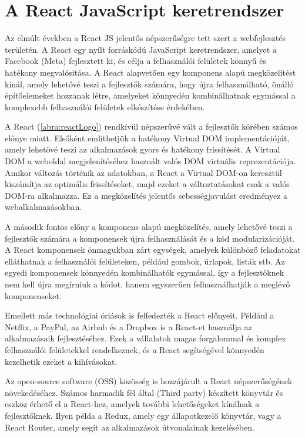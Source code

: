\section {A React JavaScript keretrendszer}

Az elmúlt években a React JS jelentős népszerűségre tett szert a webfejlesztés területén. A React egy nyílt forráskódú JavaScript keretrendszer, amelyet a Facebook (Meta) fejlesztett ki, és célja a felhasználói felületek könnyű és hatékony megvalósítása. A React alapvetően egy komponens alapú megközelítést kínál, amely lehetővé teszi a fejlesztők számára, hogy újra felhasználható, önálló építőelemeket hozzanak létre, amelyeket könnyedén kombinálhatnak egymással a komplexebb felhasználói felületek elkészítése érdekében.

A React (\ref{abra:reactLogo}) rendkívül népszerűvé vált a fejlesztők körében számos előnye miatt. Elsőként említhetjük a hatékony Virtual DOM implementációját, amely lehetővé teszi az alkalmazások gyors és hatékony frissítését. A Virtual DOM a weboldal megjelenítéséhez használt valós DOM virtuális reprezentációja. Amikor változás történik az adatokban, a React a Virtual DOM-on keresztül kiszámítja az optimális frissítéseket, majd ezeket a változtatásokat csak a valós DOM-ra alkalmazza. Ez a megközelítés jelentős sebességjavulást eredményez a webalkalmazásokban.

\pagebreak
A második fontos előny a komponens alapú megközelítés, amely lehetővé teszi a fejlesztők számára a komponensek újra felhasználását és a kód modularizációját. A React komponensek önmagukban zárt egységek, amelyek különböző feladatokat elláthatnak a felhasználói felületeken, például gombok, űrlapok, listák stb. Az egyedi komponensek könnyedén kombinálhatók egymással, így a fejlesztőknek nem kell újra megírniuk a kódot, hanem egyszerűen felhasználhatják a meglévő komponenseket.

Emellett más technológiai óriások is felfedezték a React előnyeit. Például a Netflix, a PayPal, az Airbnb és a Dropbox is a React-et használja az alkalmazásaik fejlesztéséhez. Ezek a vállalatok magas forgalommal és komplex felhasználói felületekkel rendelkeznek, és a React segítségével könnyedén kezelhetik ezeket a kihívásokat.

Az open-source software (OSS) közösség is hozzájárult a React népszerűségének növekedéséhez. Számos harmadik fél által (Third party) készített könyvtár és eszköz érhető el a React-hez, amelyek további lehetőségeket kínálnak a fejlesztőknek. Ilyen példa a Redux, amely egy állapotkezelő könyvtár, vagy a React Router, amely segít az alkalmazások útvonalainak kezelésében.


